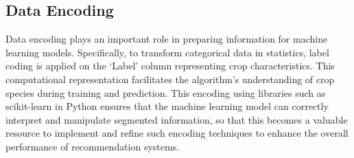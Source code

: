 \subsection{Data Encoding}
Data encoding plays an important role in preparing information for machine learning models. Specifically, to transform categorical data in statistics, label coding is applied on the ‘Label’ column representing crop characteristics. This computational representation facilitates the algorithm’s understanding of crop species during training and prediction. This encoding using libraries such as scikit-learn in Python ensures that the machine learning model can correctly interpret and manipulate segmented information, so that this becomes a valuable resource to implement and refine such encoding techniques to enhance the overall performance of recommendation systems.
% 








%
%



